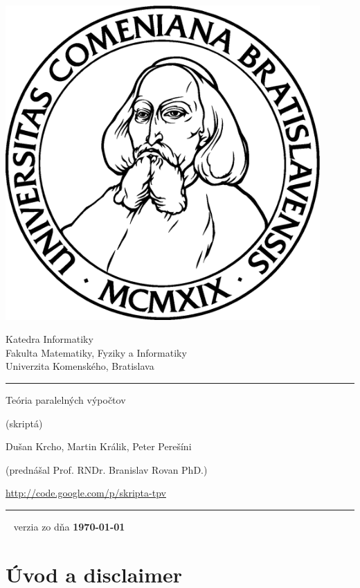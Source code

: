 \documentclass[a4paper]{report}
\title{\mytitle}
\def\mytitle{Teória paralelných výpočtov}
\begin{document}



\thispagestyle{empty}
\begin{minipage}{0.25\textwidth}
\includegraphics[width=0.9\textwidth]{img/komlogo-new}
\end{minipage}
\begin{minipage}{0.69\textwidth}
\begin{center}
\sc Katedra Informatiky \\
Fakulta Matematiky, Fyziky a Informatiky \\
Univerzita Komenského, Bratislava
\end{center}
\end{minipage}

\vfill
\begin{center}
\begin{minipage}{0.8\textwidth}
\hrule
\bigskip\bigskip
\centerline{\LARGE\sc \mytitle}
\smallskip
\centerline{(skriptá)}
\bigskip
\bigskip
\centerline{\large\sc Dušan Krcho, Martin Králik, Peter Perešíni}
\bigskip
\centerline{\large\sc (prednášal Prof. RNDr. Branislav Rovan PhD.)}
\bigskip
\centerline{\url{http://code.google.com/p/skripta-tpv}}
\bigskip
\hrule
\end{minipage}
\end{center}
\vfill
{~}
\hfill verzia zo dňa {\bf\today} 
\eject %

\section*{Úvod a disclaimer}
\end{document}
